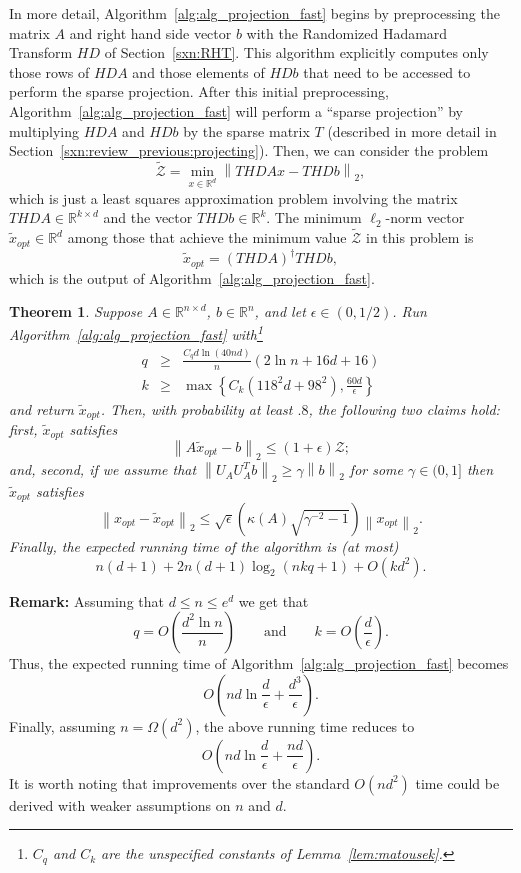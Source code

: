 \documentclass[11pt]{article}
\newcommand{\VTTNorm }[1]{\mbox{}\left\|#1\right\|_2  }
\newtheorem{theorem}{Theorem}
\begin{document}
In more detail, Algorithm~\ref{alg:alg_projection_fast} begins by preprocessing the matrix $A$ and right hand side vector $b$ with the Randomized Hadamard Transform $HD$ of Section~\ref{sxn:RHT}. This algorithm explicitly computes only those rows of $HDA$ and those elements of $HDb$ that need to be accessed to perform the sparse projection. After this initial preprocessing, Algorithm~\ref{alg:alg_projection_fast} will perform a ``sparse projection'' by multiplying $HDA$ and $HDb$ by the sparse matrix $T$ (described in more detail in
Section~\ref{sxn:review_previous:projecting}). Then, we can consider the problem
\begin{equation*}
\tilde{\mathcal{Z}}
   = \min_{x \in \mathbb{R}^d} \VTTNorm{THDAx- THDb } ,
\end{equation*}
which is just a least squares approximation problem involving the matrix $THDA \in \mathbb{R}^{k \times d}$ and the vector $THDb \in \mathbb{R}^k$. The minimum $\ell_2$-norm vector $\tilde{x}_{opt} \in \mathbb{R}^d$ among those that achieve the minimum value $\tilde{\mathcal{Z}}$ in this problem is
\begin{equation*}
\tilde{x}_{opt} = \left(THDA\right)^{\dagger}THDb,
\end{equation*}
which is the output of Algorithm~\ref{alg:alg_projection_fast}.
\begin{theorem} \label{thm:alg_projection_fast}
Suppose $A \in \mathbb{R}^{n \times d}$, $b \in \mathbb{R}^{n}$, and let $\epsilon \in (0,1/2)$. Run Algorithm~\ref{alg:alg_projection_fast} with\footnote{$C_q$ and $C_k$ are the unspecified constants of Lemma~\ref{lem:matousek}.}
\begin{eqnarray}
\label{eqn:valueqfinal} q &\geq& \frac{C_q d \ln(40nd)}{n}\left(2\ln n + 16d + 16\right)\\
\label{eqn:valuekfinal} k &\geq& \max\left\{C_k \left(118^2 d + 98^2\right),\frac{60d}{\epsilon}\right\}
\end{eqnarray}
and return $\tilde{x}_{opt}$. Then, with probability at least $.8$, the following two claims hold:
first, $\tilde{x}_{opt}$ satisfies
$$
\VTTNorm{A\tilde{x}_{opt}-b} \le (1+\epsilon) \mathcal{Z}  ;
$$
and, second, if we assume that
$\VTTNorm{U_A U_A^T b} \ge \gamma \VTTNorm{b}$ for some $\gamma \in (0,1]$
then $\tilde{x}_{opt}$ satisfies
$$
\VTTNorm{x_{opt}-\tilde{x}_{opt}}
  \leq \sqrt{\epsilon}\left(\kappa(A)\sqrt{\gamma^{-2}-1}\right)\VTTNorm{x_{opt}}.
$$
Finally, the expected running time of the algorithm is (at most)
$$
n(d+1) + 2n(d+1) \log_2 \left(nkq + 1\right) + O\left(kd^2 \right).
$$
\end{theorem}
\noindent \textbf{Remark:} Assuming that $d \leq n \leq e^d$ we get that
$$
q = O\left(\frac{d^2 \ln n}{n}\right)\qquad \text{and}\qquad
k = O\left(\frac{d}{\epsilon}\right).
$$
Thus, the expected running time of Algorithm~\ref{alg:alg_projection_fast} becomes
$$O\left(nd\ln \frac{d}{\epsilon} + \frac{d^3}{\epsilon}\right).$$
Finally, assuming $n = \Omega(d^2)$, the above running time reduces to $$O\left(nd\ln \frac{d}{\epsilon}+\frac{nd}{\epsilon}\right).$$ It is worth noting that improvements over the standard $O(nd^2)$ time could be derived with weaker assumptions on $n$ and $d$.
\end{document}
